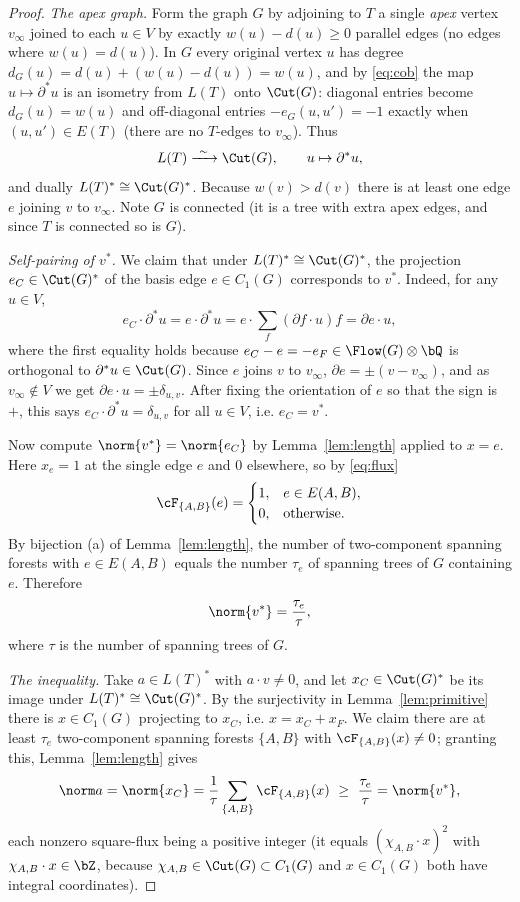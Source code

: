 \begin{proof}
\emph{The apex graph.}  Form the graph $G$ by adjoining to $T$ a single \emph{apex} vertex
$v_\infty$ joined to each $u\in V$ by exactly $w(u)-d(u)\ge0$ parallel edges (no edges where
$w(u)=d(u)$).  In $G$ every original vertex $u$ has degree
$d_G(u)=d(u)+(w(u)-d(u))=w(u)$, and by \eqref{eq:cob} the map $u\mapsto\partial^\ast u$ is an
isometry from $L(T)$ onto $\Cut(G)$: diagonal entries become $d_G(u)=w(u)$ and off-diagonal
entries $-e_G(u,u')=-1$ exactly when $(u,u')\in E(T)$ (there are no $T$-edges to $v_\infty$).
Thus
\[
L(T)\xrightarrow{\ \sim\ }\Cut(G),\qquad u\mapsto\partial^\ast u,
\]
and dually $L(T)^\ast\cong\Cut(G)^\ast$.  Because $w(v)>d(v)$ there is at least one edge $e$
joining $v$ to $v_\infty$.  Note $G$ is connected (it is a tree with extra apex edges, and
since $T$ is connected so is $G$).

\emph{Self-pairing of $v^\ast$.}  We claim that under
$L(T)^\ast\cong\Cut(G)^\ast$, the projection $e_C\in\Cut(G)^\ast$ of the basis edge
$e\in C_1(G)$ corresponds to $v^\ast$.  Indeed, for any $u\in V$,
\[
e_C\cdot\partial^\ast u=e\cdot\partial^\ast u
=e\cdot\sum_{f}(\partial f\cdot u)f=\partial e\cdot u,
\]
where the first equality holds because $e_C-e=-e_F\in\Flow(G)\otimes\bQ$ is orthogonal to
$\partial^\ast u\in\Cut(G)$.  Since $e$ joins $v$ to $v_\infty$, $\partial e=\pm(v-v_\infty)$,
and as $v_\infty\notin V$ we get $\partial e\cdot u=\pm\delta_{u,v}$.  After fixing the
orientation of $e$ so that the sign is $+$, this says $e_C\cdot\partial^\ast u=\delta_{u,v}$
for all $u\in V$, i.e. $e_C=v^\ast$.

Now compute $\norm{v^\ast}=\norm{e_C}$ by Lemma~\ref{lem:length} applied to $x=e$.  Here
$x_e=1$ at the single edge $e$ and $0$ elsewhere, so by \eqref{eq:flux}
\[
\cF_{\{A,B\}}(e)=
\begin{cases}1,& e\in E(A,B),\\0,&\text{otherwise.}\end{cases}
\]
By bijection (a) of Lemma~\ref{lem:length}, the number of two-component spanning forests with
$e\in E(A,B)$ equals the number $\tau_e$ of spanning trees of $G$ containing $e$.  Therefore
\begin{equation}
\label{eq:vstar}
\norm{v^\ast}=\frac{\tau_e}{\tau},
\end{equation}
where $\tau$ is the number of spanning trees of $G$.

\emph{The inequality.}  Take $a\in L(T)^\ast$ with $a\cdot v\ne0$, and let
$x_C\in\Cut(G)^\ast$ be its image under $L(T)^\ast\cong\Cut(G)^\ast$.  By the surjectivity in
Lemma~\ref{lem:primitive} there is $x\in C_1(G)$ projecting to $x_C$, i.e.
$x=x_C+x_F$.  We claim there are at least $\tau_e$ two-component spanning forests $\{A,B\}$
with $\cF_{\{A,B\}}(x)\ne0$; granting this, Lemma~\ref{lem:length} gives
\[
\norm a=\norm{x_C}=\frac1\tau\sum_{\{A,B\}}\cF_{\{A,B\}}(x)
\ \ge\ \frac{\tau_e}{\tau}=\norm{v^\ast},
\]
each nonzero square-flux being a positive integer (it equals $(\chi_{A,B}\cdot x)^2$ with
$\chi_{A,B}\cdot x\in\bZ$, because $\chi_{A,B}\in\Cut(G)\subset C_1(G)$ and $x\in C_1(G)$
both have integral coordinates).


\end{proof}

